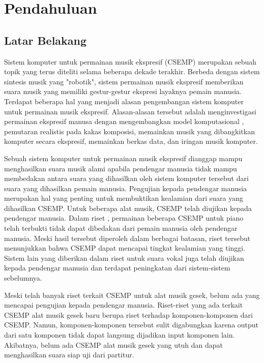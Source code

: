 \chapter{Pendahuluan}

\section{Latar Belakang}

Sistem komputer untuk permainan musik ekspresif (CSEMP) merupakan sebuah topik yang terus diteliti selama beberapa dekade terakhir. Berbeda dengan sistem sintesis musik yang "robotik", sistem permainan musik ekspresif memberikan suara musik yang memiliki gestur-gestur ekspresi layaknya pemain manusia. Terdapat beberapa hal yang menjadi alasan pengembangan sistem komputer untuk permainan musik ekspresif. Alasan-alasan tersebut adalah menginvestigasi permainan ekspresif manusa dengan mengembangkan model komputasional , pemutaran realistis pada kakas komposisi, memainkan musik yang dibangkitkan komputer secara ekspresif, memainkan berkas data, dan iringan musik komputer. \parencite{Kirke:2009:SCS:1592451.1592454}

Sebuah sistem komputer untuk permainan musik ekspresif dianggap mampu menghasilkan suara musik alami apabila pendengar manusia tidak mampu membedakan antara suara yang dihasilkan oleh sistem komputer tersebut dari suara yang dihasilkan pemain manusia. Pengujian kepada pendengar manusia merupakan hal yang penting untuk membuktikan kealamian dari suara yang dihasilkan CSEMP. Untuk beberapa alat musik, CSEMP telah diujikan kepada pendengar manusia. Dalam riset \parencite{schubert2017test}, permainan beberapa CSEMP untuk piano telah terbukti tidak dapat dibedakan dari pemain manusia oleh pendengar manusia. Meski hasil tersebut diperoleh dalam berbagai batasan, riset tersebut menunjukkan bahwa CSEMP dapat mencapai tingkat kealamian yang tinggi. Sistem lain yang diberikan dalam riset \parencite{bonada2017singing} untuk suara vokal juga telah diujikan kepada pendengar manusia dan terdapat peningkatan dari sistem-sistem sebelumnya.

Meski telah banyak riset terkait CSEMP untuk alat musik gesek, belum ada yang mencapai pengujian kepada pendengar manusia. Riset-riset yang ada terkait CSEMP alat musik gesek baru berupa riset terhadap komponen-komponen dari CSEMP. Namun, komponen-komponen tersebut sulit digabungkan karena output dari satu komponen tidak dapat langsung dijadikan input komponen lain. Akibatnya, belum ada CSEMP alat musik gesek yang utuh dan dapat menghasilkan suara siap uji dari partitur.

